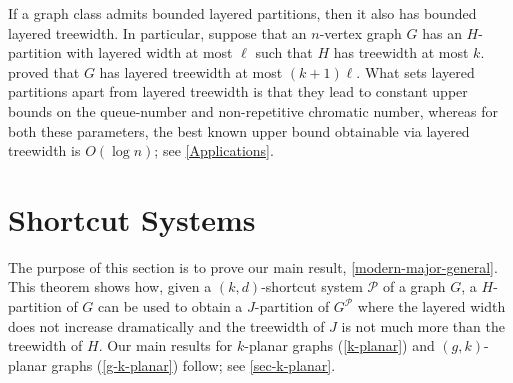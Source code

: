 \documentclass{patmorin}
\begin{document}
If a graph class admits bounded layered partitions, then it also has bounded layered treewidth. In particular, suppose that an $n$-vertex graph $G$ has an $H$-partition with layered width at most $\ell$ such that $H$ has treewidth at most $k$. \citet{dujmovic.joret.ea:planar} proved that $G$ has layered treewidth at most $(k+1)\ell$. 
What sets layered partitions apart from layered treewidth is that they lead to constant upper bounds on the queue-number  and non-repetitive chromatic number, whereas for both these parameters, the best known upper bound obtainable via layered treewidth is $O(\log n)$; see \cref{Applications}. 

%
%



\section{Shortcut Systems}
\label{Structure}

The purpose of this section is to prove our main result, \cref{modern-major-general}. This theorem shows how, given a $(k,d)$-shortcut system $\mathcal{P}$ of a graph $G$, a $H$-partition of $G$ can be used to obtain a $J$-partition of $G^{\mathcal{P}}$ where the layered width  does not increase dramatically and the treewidth of $J$ is not much more than the treewidth of $H$.  Our main results for $k$-planar graphs (\cref{k-planar}) and $(g,k)$-planar graphs (\cref{g-k-planar}) follow; see \cref{sec-k-planar}.
\end{document}
